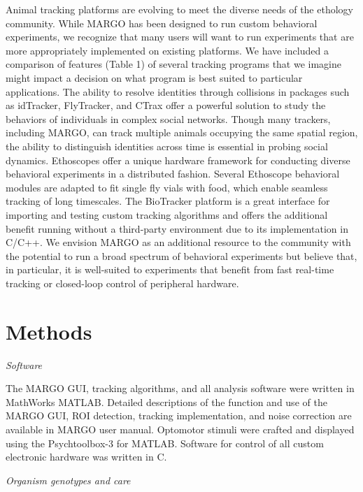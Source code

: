 \documentclass[10pt]{article}
\begin{document}
\begin{multicols}{2}
Animal tracking platforms are evolving to meet the diverse needs of the ethology community. While MARGO has been designed to run custom behavioral experiments, we recognize that many users will want to run experiments that are more appropriately implemented on existing platforms. We have included a comparison of features (Table 1) of several tracking programs that we imagine might impact a decision on what program is best suited to particular applications. The ability to resolve identities through collisions in packages such as idTracker, FlyTracker, and CTrax offer a powerful solution to study the behaviors of individuals in complex social networks. Though many trackers, including MARGO, can track multiple animals occupying the same spatial region, the ability to distinguish identities across time is essential in probing social dynamics. Ethoscopes offer a unique hardware framework for conducting diverse behavioral experiments in a distributed fashion. Several Ethoscope behavioral modules are adapted to fit single fly vials with food, which enable seamless tracking of long timescales. The BioTracker platform is a great interface for importing and testing custom tracking algorithms and offers the additional benefit running without a third-party environment due to its implementation in C/C++.  We envision MARGO as an additional resource to the community with the potential to run a broad spectrum of behavioral experiments but believe that, in particular, it is well-suited to experiments that benefit from fast real-time tracking or closed-loop control of peripheral hardware. 

\section*{Methods}

\textit{Software}

The MARGO GUI, tracking algorithms, and all analysis software were written in MathWorks MATLAB. Detailed descriptions of the function and use of the MARGO GUI, ROI detection, tracking implementation, and noise correction are available in MARGO user manual. Optomotor stimuli were crafted and displayed using the Psychtoolbox-3 for MATLAB. Software for control of all custom electronic hardware was written in C.

\textit{Organism genotypes and care}


\end{multicols}
\end{document}
